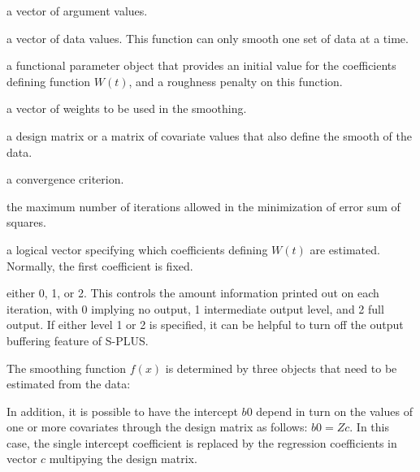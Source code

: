 \begin{Arguments}
\begin{ldescription}
\item[\code{x}] a vector of argument values.

\item[\code{y}] a vector of data values.  This function can only smooth
one set of data at a time.

\item[\code{WfdParobj}] a functional parameter object that provides an initial
value for the coefficients defining function $W(t)$,
and a roughness penalty on this function.

\item[\code{wt}] a vector of weights to be used in the smoothing.

\item[\code{zmat}] a design matrix or a matrix of covariate values that also
define the smooth of the data.

\item[\code{conv}] a convergence criterion.

\item[\code{iterlim}] the maximum number of iterations allowed in the minimization
of error sum of squares.

\item[\code{active}] a logical vector specifying which coefficients defining
$W(t)$ are estimated.  Normally, the first coefficient
is fixed.

\item[\code{dbglev}] either 0, 1, or 2.  This controls the amount information printed out on
each iteration, with 0 implying no output, 1 intermediate output level,
and 2 full output.  If either level 1 or 2 is specified, it can be
helpful to turn off the output buffering feature of S-PLUS.

\end{ldescription}
\end{Arguments}
\begin{Details}\relax
The smoothing function  $f(x)$ is determined by
three objects that need to be estimated from the data:

In addition, it is possible to have the intercept $b0$
depend in turn on the values of one or more covariates through the
design matrix  as follows:
$b0 = Z c$. In this case, the single
intercept coefficient is replaced by the regression coefficients
in vector $c$ multipying the design matrix.
\end{Details}
